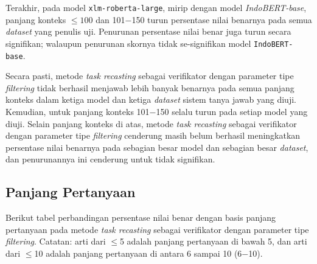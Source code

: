 Terakhir, pada model \texttt{xlm-roberta-large}, mirip dengan model \emph{IndoBERT-base}, panjang konteks $\leq100$ dan 101$-$150 turun persentase nilai benarnya pada semua \emph{dataset} yang penulis uji. Penurunan persentase nilai benar juga turun secara signifikan; walaupun penurunan skornya tidak se-signifikan model \texttt{IndoBERT-base}.

Secara pasti, metode \emph{task recasting} sebagai verifikator dengan parameter tipe \emph{filtering} tidak berhasil menjawab lebih banyak benarnya pada semua panjang konteks dalam ketiga model dan ketiga \emph{dataset} sistem tanya jawab yang diuji. Kemudian, untuk panjang konteks 101$-$150 selalu turun pada setiap model yang diuji. Selain panjang konteks di atas, metode \emph{task recasting} sebagai verifikator dengan parameter tipe \emph{filtering} cenderung masih belum berhasil meningkatkan persentase nilai benarnya pada sebagian besar model dan sebagian besar \emph{dataset}, dan penurunannya ini cenderung untuk tidak signifikan.

\subsection{Panjang Pertanyaan}
Berikut tabel perbandingan persentase nilai benar dengan basis panjang pertanyaan pada metode \emph{task recasting} sebagai verifikator dengan parameter tipe \emph{filtering}. Catatan: arti dari $\leq$5 adalah panjang pertanyaan di bawah 5, dan arti dari $\leq$10 adalah panjang pertanyaan di antara 6 sampai 10 (6$-$10).


